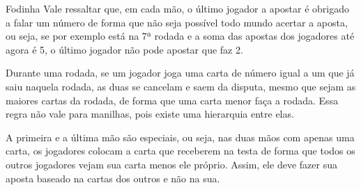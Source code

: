 \begin{subsecao}{Fodinha}
Vale ressaltar que, em cada mão, o último jogador a apostar é obrigado a falar um número de
forma que não seja possível todo mundo acertar a aposta, ou seja, se por exemplo está na 7ª rodada
e a soma das apostas dos jogadores até agora é 5, o último jogador não pode apostar que faz 2.

Durante uma rodada, se um jogador joga uma carta de número igual a um que já saiu naquela
rodada, as duas se cancelam e saem da disputa, mesmo que sejam as maiores cartas da rodada,
de forma que uma carta menor faça a rodada. Essa regra não vale para manilhas, pois existe uma
hierarquia entre elas.

A primeira e a última mão são especiais, ou seja, nas duas mãos com apenas uma 
carta, os jogadores colocam a carta que receberem na testa de forma que todos os outros jogadores 
vejam sua carta menos ele próprio. Assim, ele deve fazer sua aposta baseado na cartas dos outros e
não na sua.

\end{subsecao}

